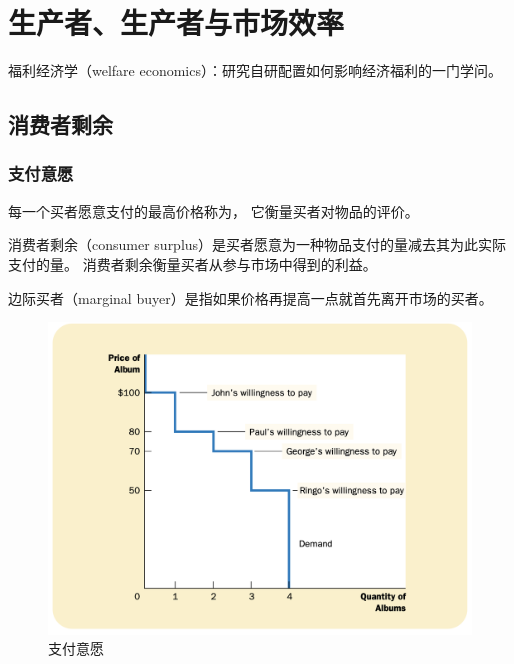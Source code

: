 
\chapter{生产者、生产者与市场效率}

福利经济学（welfare economics）：研究自研配置如何影响经济福利的一门学问。


\section{消费者剩余}

\subsection{支付意愿}

每一个买者愿意支付的最高价格称为，
它衡量买者对物品的评价。


消费者剩余（consumer surplus）是买者愿意为一种物品支付的量减去其为此实际支付的量。
消费者剩余衡量买者从参与市场中得到的利益。

边际买者（marginal buyer）是指如果价格再提高一点就首先离开市场的买者。


\begin{figure}[!ht]
  \centering
  \includegraphics[width=\textwidth]{pics/willingness-to-pay}
  \caption{支付意愿}
  \label{fig:willingness-to-pay}
\end{figure}

